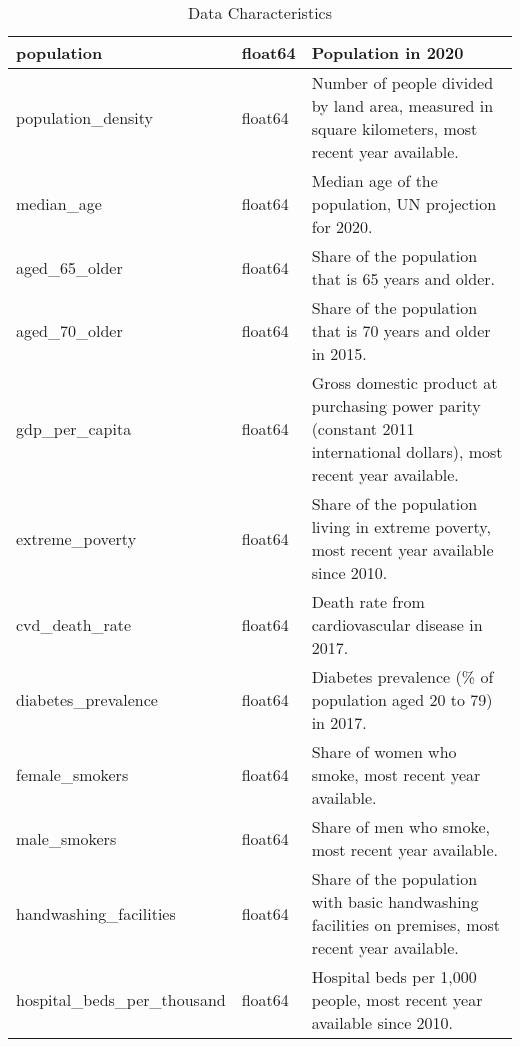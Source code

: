 \documentclass[10pt]{article}
\begin{document}
\begin{table}[htbp]
\begin{tabular}{|l|l|p{8cm}|}
        \hline
        population & float64 & Population in 2020 \\
        \hline
        population\_density & float64 & Number of people divided by land area, measured in square kilometers, most recent year available. \\
        \hline
        median\_age & float64 & Median age of the population, UN projection for 2020. \\
        \hline
        aged\_65\_older & float64 & Share of the population that is 65 years and older. \\
        \hline
        aged\_70\_older & float64 & Share of the population that is 70 years and older in 2015. \\
        \hline
        gdp\_per\_capita & float64 & Gross domestic product at purchasing power parity (constant 2011 international dollars), most recent year available. \\
        \hline
        extreme\_poverty & float64 & Share of the population living in extreme poverty, most recent year available since 2010. \\
        \hline
        cvd\_death\_rate & float64 & Death rate from cardiovascular disease in 2017. \\
        \hline
        diabetes\_prevalence & float64 & Diabetes prevalence (\% of population aged 20 to 79) in 2017. \\
        \hline
        female\_smokers & float64 & Share of women who smoke, most recent year available. \\
        \hline
        male\_smokers & float64 & Share of men who smoke, most recent year available. \\
        \hline
        handwashing\_facilities & float64 & Share of the population with basic handwashing facilities on premises, most recent year available. \\
        \hline
        hospital\_beds\_per\_thousand & float64 & Hospital beds per 1,000 people, most recent year available since 2010. \\
        \hline
    \end{tabular}
	\caption{Data Characteristics}
	\label{tab:data_chars}
\end{table}




%
%
\end{document}
